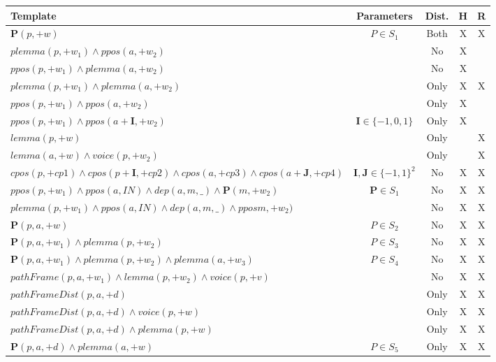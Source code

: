 \begin{table*}[th]
\centering
\begin{tabular}{|p{11cm}|c|c|c|c|}\hline
   Template               & Parameters & Dist. & H & R \\\hline\hline
   $ \mathbf{P}(p,+w)         $    & $P \in S_1$   & Both & X & X \\\hline
   $ plemma (p,+w_1) \land ppos(a,+w_2) $   & & No    & X &  \\\hline
   $ ppos(p,+w_1) \land plemma(a,+w_2)  $   & & No    & X &  \\\hline
   $ plemma(p,+w_1) \land plemma(a,+w_2)$   & & Only  & X & X \\\hline
   $ ppos(p,+w_1) \land ppos(a,+w_2)$       & & Only  & X &   \\\hline
   $ ppos(p,+w_1) \land ppos(a+\mathbf{I},+w_2)$     & $\mathbf{I} \in \{-1,0,1\}$ & Only& X &   \\\hline
   $ lemma(p,+w)$ & & Only & & X  \\\hline
   $ lemma(a,+w) \land voice(p,+w_2)$ & & Only & & X  \\\hline
   $ cpos(p,+cp1) \land cpos(p+\mathbf{I},+cp2) \land cpos(a,+cp3) \land cpos(a+\mathbf{J},+cp4)$ & $\mathbf{I},\mathbf{J} \in \{-1,1\}^2$ & No & X & X\\\hline
   $ ppos(p,+w_1) \land ppos(a,IN) \land dep(a,m,\_) \land \mathbf{P}(m,+w_2) $ & $\mathbf{P} \in S_1$ & No & X &  X \\\hline
   $ plemma(p,+w_1) \land ppos(a,IN) \land dep(a,m,\_) \land pposm,+w_2) $ & & No & X &  X \\\hline
   $ \mathbf{P}(p,a,+w)         $    & $P \in S_2$ & No & X & X \\\hline
   $ \mathbf{P}(p,a,+w_1) \land plemma(p,+w_2) $ & $P \in S_3$           & No  & X & X \\\hline
   $ \mathbf{P}(p,a,+w_1) \land plemma(p,+w_2) \land plemma(a,+w_3) $    &   $P \in S_4$ & No  & X & X \\\hline
   $ pathFrame(p,a,+w_1) \land lemma(p,+w_2) \land voice(p,+v) $ &      & No      & X & X \\\hline
   $ pathFrameDist(p,a,+d) $      &  & Only   & X & X \\\hline
   $ pathFrameDist(p,a,+d) \land voice(p,+w) $ &  & Only           & X & X \\\hline
   $ pathFrameDist(p,a,+d) \land plemma(p,+w)$ &  & Only           & X & X \\\hline
   $ \mathbf{P}(p,a,+d) \land plemma(a,+w) $ & $P \in S_5$ & Only         & X & X \\\hline

\end{tabular}
\end{table*}
